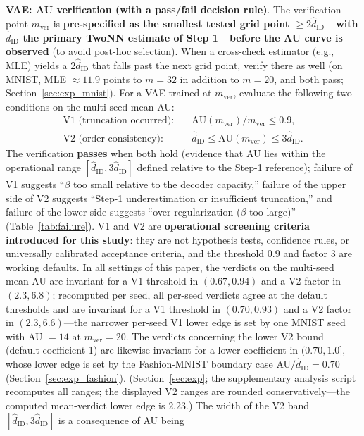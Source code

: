 \documentclass[make,article,submit,pdftex,moreauthors]{Definitions/mdpi}
\newcommand{\hatdID}{\hat{d}_{\mathrm{ID}}}
\begin{document}
\textbf{VAE: AU verification (with a pass/fail decision rule)}.
The verification point $m_{\mathrm{ver}}$ is \textbf{pre-specified as the
smallest tested grid point $\geq 2\hatdID$---with $\hatdID$ the primary
TwoNN estimate of Step 1---before the AU curve is observed} (to avoid
post-hoc selection).
When a cross-check estimator (e.g., MLE) yields a $2\hatdID$ that falls
past the next grid point, verify there as well (on MNIST, MLE
$\approx 11.9$ points to $m = 32$ in addition to $m = 20$, and both pass;
Section~\ref{sec:exp_mnist}).
For a VAE trained at $m_{\mathrm{ver}}$, evaluate the following two
conditions on the multi-seed mean AU:
\begin{align}
  \text{V1 (truncation occurred)}:&\quad
  \mathrm{AU}(m_{\mathrm{ver}}) / m_{\mathrm{ver}} \leq 0.9,
  \label{eq:rule_v1}\\
  \text{V2 (order consistency)}:&\quad
  \hatdID \leq \mathrm{AU}(m_{\mathrm{ver}}) \leq 3\hatdID.
  \label{eq:rule_v2}
\end{align}
The verification \textbf{passes} when both hold (evidence that AU lies
within the operational range $[\hatdID, 3\hatdID]$ defined relative to the
Step-1 reference);
failure of V1 suggests ``$\beta$ too small relative to the decoder
capacity,'' failure of the upper side of V2 suggests ``Step-1
underestimation or insufficient truncation,'' and failure of the lower side
suggests ``over-regularization ($\beta$ too large)''
(Table~\ref{tab:failure}).
V1 and V2 are \textbf{operational screening criteria introduced for this
study}: they are not hypothesis tests, confidence rules, or universally
calibrated acceptance criteria, and the threshold $0.9$ and factor $3$ are
working defaults.
In all settings of this paper, the verdicts on the multi-seed mean AU are
invariant for a V1 threshold in $(0.67, 0.94)$ and a V2 factor in
$(2.3, 6.8)$; recomputed per seed, all per-seed verdicts agree at the
default thresholds and are invariant for a V1 threshold in $(0.70, 0.93)$ and
a V2 factor in $(2.3, 6.6)$---the narrower per-seed V1 lower edge is set by
one MNIST seed with AU $= 14$ at $m_{\mathrm{ver}} = 20$.
The verdicts concerning the lower V2 bound (default coefficient 1) are
likewise invariant for a lower coefficient in $(0.70, 1.0]$, whose lower
edge is set by the Fashion-MNIST boundary case AU$/\hatdID = 0.70$
(Section~\ref{sec:exp_fashion}).
(Section~\ref{sec:exp}; the supplementary analysis script recomputes all
ranges; the displayed V2 ranges are rounded conservatively---the computed
mean-verdict lower edge is $2.23$.)
The width of the V2 band $[\hatdID, 3\hatdID]$ is a consequence of AU being
\end{document}
